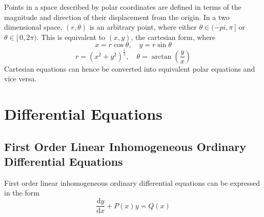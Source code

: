 \documentclass{article}
\newcommand{\de}{\textrm{d}}
\begin{document}
\begin{multicols}{2}

    \begin{center}


    \end{center}

    \noindent Points in a space described by polar coordinates are defined in
    terms of the magnitude and direction of their displacement from the origin.
    In a two dimensional space, \(\left( r, \theta \right)\) is an arbitrary
    point, where either \(\theta \in (-pi, \pi \,]\) or \(\theta \in [\, 0, 2
    \pi)\). This is equivalent to \((x, y)\), the cartesian form, where \[x = r
    \cos \theta, \quad y = r \sin \theta\] \[r = \left( x^2 + y^2
        \right)^{\frac{1}{2}}, \quad \theta = \arctan \left( \frac{y}{x}
    \right)\] Cartesian equations can hence be converted into equivalent polar
    equations and vice versa. 

\end{multicols}

\section{Differential Equations}

\subsection{First Order Linear Inhomogeneous Ordinary Differential Equations}

First order linear inhomogeneous ordinary differential equations can be
expressed in the form \[\frac{\de y}{\de x} + P(x)y = Q(x)\]
\end{document}
